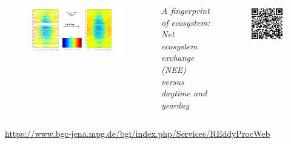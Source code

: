 \begin{columns}
    \begin{figure}[tb]
    \begin{center}
        \includegraphics[width=.95\textwidth]{images/content/DE-Tha_1998_FP_NEE_ffc}
    \end{center}
    \end{figure}
\small{\textit{A fingerprint of ecosystem: Net ecosystem exchange (NEE) versus daytime and yearday}}
\vspace{4cm}
	\begin{figure}[tb]
		\includegraphics[width=.6\textwidth]{images/qrcodeREddyProc.jpg}
	\end{figure}
\end{columns}
\vspace{1cm}
\hfill\large{\url{https://www.bgc-jena.mpg.de/bgi/index.php/Services/REddyProcWeb}}
